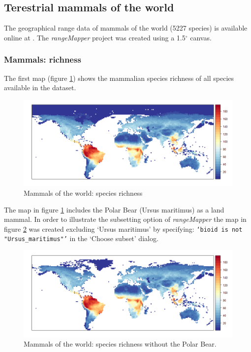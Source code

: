 \documentclass[ a4paper ]{article}
\begin{document}
\subsection{Terestrial mammals of the world}
The geographical range data of mammals of the world (5227 species) is available online at \cite{iucn09}. The \emph{rangeMapper} project was created using a 1.5$^{\circ}$ canvas.

\subsubsection{Mammals: richness}
The first map (figure \ref{fig:map1c}) shows the mammalian species richness of all species available in the dataset. 
 
 \begin{figure}[htbp]
  \begin{center}
	\includegraphics[width=1\linewidth]{map1c}
    \caption{\label{fig:map1c} Mammals of the world: species richness}
  \end{center}
\end{figure}

 
The  map in figure \ref{fig:map1c} includes the Polar Bear (Ursus maritimus) as a land mammal. In order to illustrate the subsetting option of \emph{rangeMapper} the  map in figure \ref{fig:map1d} was created excluding `Ursus maritimus' by specifying: \texttt{`bioid is not  "Ursus\_maritimus"'} in the `Choose subset' dialog.


 \begin{figure}[htbp]
  \begin{center}
	\includegraphics[width=1\linewidth]{map1d}
    \caption{\label{fig:map1d} Mammals of the world: species richness without the Polar Bear.}
  \end{center}
\end{figure}
\end{document}

